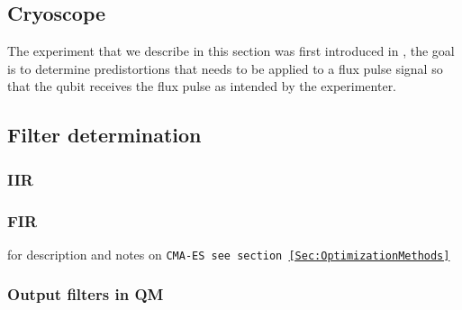\subsection{Cryoscope}
The experiment that we describe in this section was first introduced in \cite{rol_time-domain_2020}, the goal is to determine predistortions that needs to be applied to a flux pulse signal so that the qubit receives the flux pulse as intended by the experimenter.

\begin{comment}
    TO DO LIST:
    * calcoli analitici per assunzioni del cryoscope
    * calcoli analitici di convoluzioni per dimostrare che è giusto il modo in cui combiniamo i filtri
    * costruire script per analisi dati
    * eventualmente provare ad aggiungere più correzioni esponenziali
\end{comment}
\subsection{Filter determination}
\subsubsection{IIR}
\subsubsection{FIR}
for description and notes on \tt{CMA-ES} see section \ref{Sec:OptimizationMethods}
\subsubsection{Output filters in QM}
